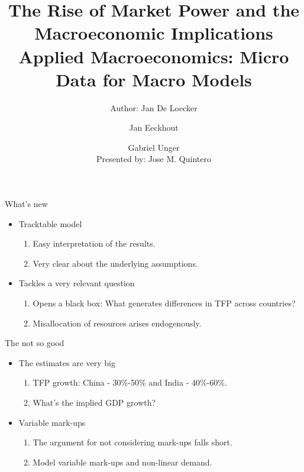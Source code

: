 \documentclass[usenames,dvipsnames,aspectratio=169]{beamer}
\title{The Rise of Market Power and the Macroeconomic Implications  \small{Applied Macroeconomics: Micro Data for Macro Models} }
\author{Author: Jan De Loecker \and Jan Eeckhout \and Gabriel Unger \\ Presented by: Jose M. Quintero}
\begin{document}
\begin{frame}
  \titlepage
\end{frame}

\begin{frame}{What's new}
\begin{itemize}[label=\textcolor{teal}{$\blacktriangleright$}]
    \item Tracktable model 
    \begin{enumerate}[label=\textbf{\textcolor{teal}{\arabic*.}}]
        \item Easy interpretation of the results.
        \item Very clear about the underlying assumptions. 
    \end{enumerate}
    \vfill
    \item Tackles a very relevant question 
    \begin{enumerate}[label=\textbf{\textcolor{teal}{\arabic*.}}]
        \item Opens a black box: What generates differences in TFP across countries?
        \item Misallocation of resources arises endogenously. 
    \end{enumerate}
\end{itemize}
\end{frame}

\begin{frame}{The not so good}
     \begin{itemize}[label=\textcolor{teal}{$\blacktriangleright$}]
         \item The estimates are very big
         \begin{enumerate}[label=\textbf{\textcolor{teal}{\arabic*.}}]
             \item TFP growth: China - 30\%-50\% and India - 40\%-60\%. 
             \item What's the implied GDP growth?
         \end{enumerate}
         \vfill
         \item Variable mark-ups
         \begin{enumerate}[label=\textbf{\textcolor{teal}{\arabic*.}}]
             \item The argument for not considering mark-ups falls short. 
             \item Model variable mark-ups and non-linear demand. 
         \end{enumerate}
     \end{itemize}
\end{frame}
\end{document}
